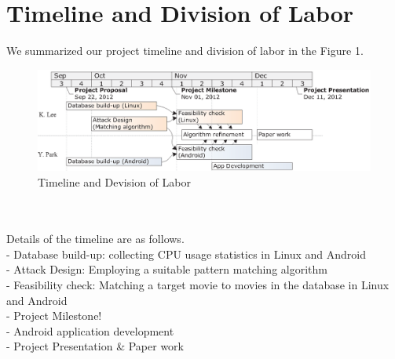 \section{Timeline and Division of Labor}
\label{sec:timeline}
\indent We summarized our project timeline and division of labor in the Figure 1.\\
\vspace{-0.3in} 
\begin{figure}[!ht]
\centering
\includegraphics[scale=1]{Figures/Timeline}
\caption{Timeline and Devision of Labor}
\end{figure}\\
\\Details of the timeline are as follows. \\
- Database build-up: collecting CPU usage statistics in Linux and Android\\
- Attack Design: Employing a suitable pattern matching algorithm\\
- Feasibility check: Matching a target movie to movies in the database in Linux and Android \\
- Project Milestone!\\
- Android application development\\
- Project Presentation \& Paper work
